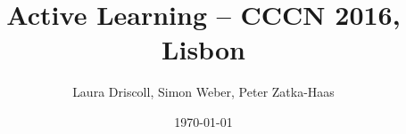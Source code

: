 \documentclass[12pt]{article}
\begin{document}
\doublespacing

\title{Active Learning -- CCCN 2016, Lisbon}

\author{Laura Driscoll, Simon Weber, Peter Zatka-Haas}
\date{\today}

\setlength{\droptitle}{-10em}

\maketitle






\newpage
 

\end{document}
